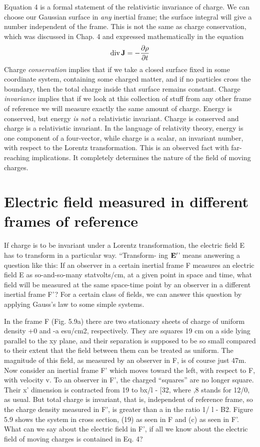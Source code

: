 Equation 4 is a formal statement of the relativistic invariance of
charge. We can choose our Gaussian surface in \emph{any} inertial frame;
the surface integral will give a number independent of the frame.
This is not the same as charge conservation, which was discussed in
Chap. 4 and expressed mathematically in the equation
\begin{equation*}
  \operatorname{div}\mathbf{J} = -\frac{\partial\rho}{\partial t}
\end{equation*}
Charge \emph{conservation} implies that if we take a closed surface fixed in
some coordinate system, containing some charged matter, and if no
particles cross the boundary, then the total charge inside that surface
remains constant. Charge \emph{invariance} implies that if we look at this
collection of stuff from any other frame of reference we will measure
exactly the same amount of charge. Energy is conserved, but energy
\emph{is not} a relativistic invariant. Charge is conserved and charge is a
relativistic invariant. In the language of relativity theory, energy is
one component of a four-vector, while charge is a scalar, an invariant
number, with respect to the Lorentz transformation. This is an observed
fact with far-reaching implications. It completely determines
the nature of the field of moving charges.

\iffalse

\section{Electric field measured in different frames of reference}

If charge is to be invariant under a Lorentz transformation, the
electric field E has to transform in a particular way. ``Transform-
ing $\mathbf{E}'$' means answering a question like this: If an observer in a certain
inertial frame F measures an electric field E as so-and-so-many
statvolts/cm, at a given point in space and time, what field will be
measured at the same space-time point by an observer in a different
inertial frame F'? For a certain class of fields, we can answer this
question by applying Gauss's law to some simple systems.

In the frame F (Fig. 5.9a) there are two stationary sheets of charge
of uniform density +0 and -a esu/cm2, respectively. They are
squares 19 cm on a side lying parallel to the xy plane, and their separation
is supposed to be so small compared to their extent that the field
between them can be treated as uniform. The magnitude of this
field, as measured by an observer in F, is of course just 47m. Now
consider an inertial frame F' which moves toward the left, with
respect to F, with velocity v. To an observer in F', the charged
``squares'' are no longer square. Their x' dimension is contracted
from 19 to bx/l - [32, where ,8 stands for 12/0, as usual. But total
charge is invariant, that is, independent of reference frame, so the
charge density measured in F', is greater than a in the ratio 1/ \/l - B2.
Figure 5.9 shows the system in cross section, (19) as seen in F and (c)
as seen in F'. What can we say about the electric field in F', if all
we know about the electric field of moving charges is contained in
Eq. 4?

